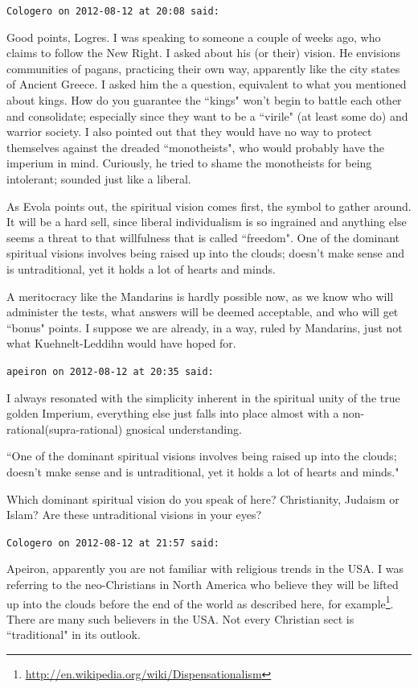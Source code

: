 \begin{footnotesize}
\begin{sffamily}
\hfill

\texttt{Cologero on 2012-08-12 at 20:08 said: }

Good points, Logres. I was speaking to someone a couple of weeks ago, who claims to follow the New Right. I asked about his (or their) vision. He envisions communities of pagans, practicing their own way, apparently like the city states of Ancient Greece. I asked him the a question, equivalent to what you mentioned about kings. How do you guarantee the ``kings" won't begin to battle each other and consolidate; especially since they want to be a ``virile" (at least some do) and warrior society. I also pointed out that they would have no way to protect themselves against the dreaded ``monotheists", who would probably have the imperium in mind. Curiously, he tried to shame the monotheists for being intolerant; sounded just like a liberal.

As Evola points out, the spiritual vision comes first, the symbol to gather around. It will be a hard sell, since liberal individualism is so ingrained and anything else seems a threat to that willfulness that is called ``freedom". One of the dominant spiritual visions involves being raised up into the clouds; doesn't make sense and is untraditional, yet it holds a lot of hearts and minds.

A meritocracy like the Mandarins is hardly possible now, as we know who will administer the tests, what answers will be deemed acceptable, and who will get ``bonus" points. I suppose we are already, in a way, ruled by Mandarins, just not what Kuehnelt-Leddihn would have hoped for.


\hfill

\texttt{apeiron on 2012-08-12 at 20:35 said: }

I always resonated with the simplicity inherent in the spiritual unity of the true golden Imperium, everything else just falls into place almost with a non-rational(supra-rational) gnosical understanding. 

``One of the dominant spiritual visions involves being raised up into the clouds; doesn't make sense and is untraditional, yet it holds a lot of hearts and minds."

Which dominant spiritual vision do you speak of here? Christianity, Judaism or Islam? Are these untraditional visions in your eyes?


\hfill

\texttt{Cologero on 2012-08-12 at 21:57 said: }

Apeiron, apparently you are not familiar with religious trends in the USA. I was referring to the neo-Christians in North America who believe they will be lifted up into the clouds before the end of the world as described here, for example\footnote{\url{http://en.wikipedia.org/wiki/Dispensationalism}}. There are many such believers in the USA. Not every Christian sect is ``traditional" in its outlook.


\end{sffamily}
\end{footnotesize}
